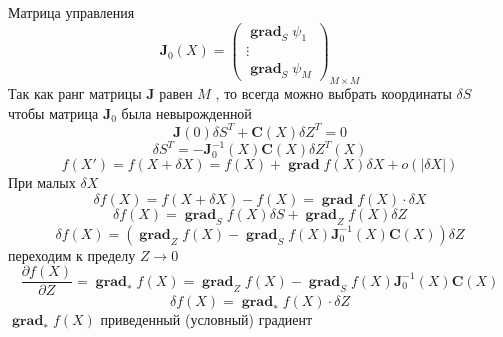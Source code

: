 \documentclass[14pt]{extarticle}
\DeclareMathOperator{\grad}{\textbf{grad}}
\begin{document}
     Матрица управления
     \begin{equation}
	     \mathbf{J}_{0}(X)
	     =
	     \begin{pmatrix} 
	     \grad_{S} \psi_{1} \\
	     \vdots\\
	     \grad_{S} \psi_{M}
	     \end{pmatrix} _{M \times M}
     \end{equation} 
     Так как ранг матрицы $\mathbf{J}$ равен
     $M$ , то всегда можно выбрать  координаты  $\delta S$ 
     чтобы матрица  $\mathbf{J}_{0}$ была невырожденной
     \begin{equation}
     \mathbf{J}(0) \delta S^{T} + \mathbf{C}(X) \delta Z^{T} = 0
     \end{equation} 
     \begin{equation}
     \delta S^{T} = - \mathbf{J}^{-1}_{0}(X) \mathbf{C}(X) \delta Z^{T}(X)
     \end{equation} 
     \begin{equation}
     f(X') = f(X + \delta X) = 
     f(X) + \grad f(X) \delta X + o(|\delta X|)
     \end{equation} 
     При малых $\delta X$
     \begin{equation}
     \delta f(X) = f(X + \delta X) - f(X)  = \grad f(X) \cdot \delta X
     \end{equation} 
     \begin{equation}
     \delta f(X) = \grad_{S} f(X) \delta S + \grad_{Z} f(X) \delta Z
     \end{equation} 
     \begin{equation}
     \delta f(X)  = (\grad_{Z} f(X) - \grad_{S} f(X) \mathbf{J}_{0}^{-1}(X) \mathbf{C}(X)) \delta Z
     \end{equation} 
     переходим к пределу $Z \to 0$
      \begin{equation}
     \frac{\partial f(X)}{\partial Z} = 
     \grad_{*} f(X)= 
     \grad_{Z} f(X) - \grad_{S} f(X) \mathbf{J}_{0}^{-1}(X) \mathbf{C}(X)
     \end{equation} 
     \begin{equation}
     \delta f(X) = \grad_{*} f(X) \cdot \delta Z
     \end{equation} 
     $\grad_{*} f(X)$ приведенный (условный) градиент
\end{document}
